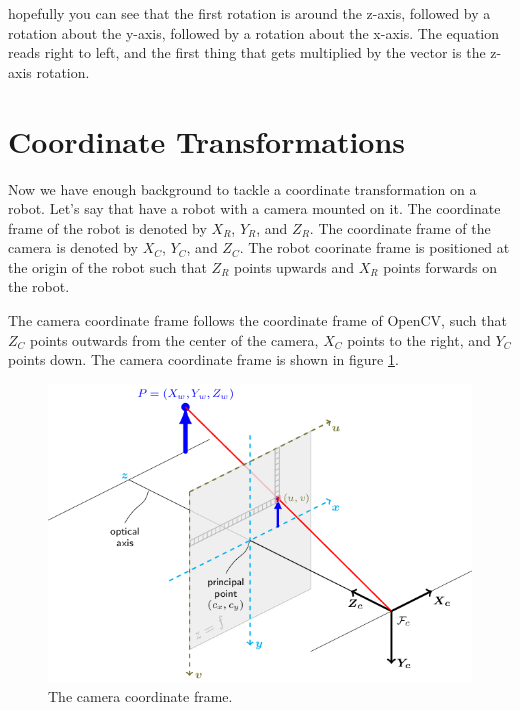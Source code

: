 \documentclass[11pt]{article}
\begin{document}
hopefully you can see that the first rotation is around the z-axis, followed by a rotation
about the y-axis, followed by a rotation about the x-axis.  The equation reads right
to left, and the first thing that gets multiplied by the vector is the z-axis rotation.


\section{Coordinate Transformations}
\label{sec:transformations}

Now we have enough background to tackle a coordinate transformation on a robot.  Let’s say  
that have a robot with a camera mounted on it.  The coordinate frame of the robot is denoted
by $X_R$, $Y_R$, and $Z_R$.  The coordinate frame of the camera is denoted by $X_C$, $Y_C$,
and $Z_C$.  The robot coorinate frame is positioned at the origin of the robot such that
$Z_R$ points upwards and $X_R$ points forwards on the robot.

The camera coordinate frame follows the coordinate frame of OpenCV, such that $Z_C$ points
outwards from the center of the camera, $X_C$ points to the right, and $Y_C$ points down.  The
camera coordinate frame is shown in figure \ref{fig:pinhole_camera_model}.

\begin{figure}[h!]
    \centering
    \includegraphics[scale=0.5]{figures/pinhole_camera_model.png}
    \caption{The camera coordinate frame.}
    \label{fig:pinhole_camera_model}
\end{figure}
\end{document}

